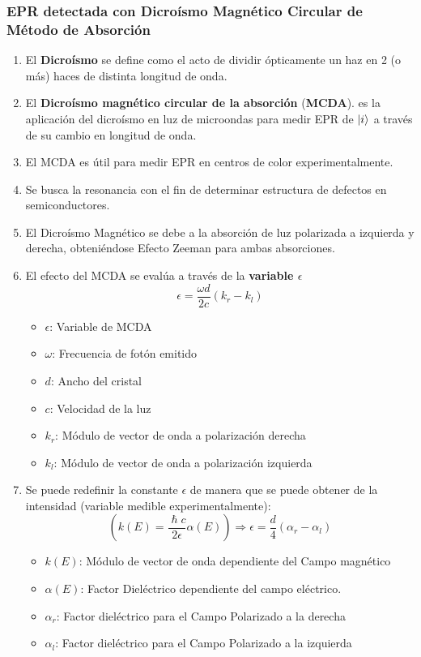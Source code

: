 \documentclass[aps,rmp,reprint,longbibliography]{revtex4-1}
\begin{document}
\subsubsection{EPR detectada con Dicroísmo Magnético Circular de Método de Absorción}
\begin{enumerate}
\item El \textbf{Dicroísmo} se define como el acto de dividir ópticamente un haz en 2 (o más) haces de distinta longitud de onda.
\item El \textbf{Dicroísmo magnético circular de la absorción} (\textbf{MCDA}). es la aplicación del dicroísmo en luz de microondas para medir EPR de $\ket{i}$ a través de su cambio en longitud de onda.
\item El MCDA es útil para medir EPR en centros de color experimentalmente. 
\item Se busca la resonancia con el fin de determinar estructura de defectos en semiconductores. 
\item El Dicroísmo Magnético se debe a la absorción de luz polarizada a izquierda y derecha, obteniéndose Efecto Zeeman para ambas absorciones.
\item El efecto del MCDA se evalúa a través de la \textbf{variable $\epsilon$}
\begin{equation}\label{eq21}\epsilon=\frac{\omega d}{2c}(k_r-k_l)\end{equation}
\begin{itemize}
    \item $\epsilon$: Variable de MCDA
    \item $\omega$: Frecuencia de fotón emitido
    \item $d$: Ancho del cristal 
    \item $c$: Velocidad de la luz
    \item $k_r$: Módulo de vector de onda a polarización derecha
    \item $k_l$: Módulo de vector de onda a polarización izquierda
\end{itemize}
\item Se puede redefinir la constante $\epsilon$ de manera que se puede obtener de la intensidad (variable medible experimentalmente):
\begin{equation}\label{eq22}(k(E)=\frac{\hslash c}{2 \epsilon} \alpha(E))\Rightarrow \epsilon =\frac{d}{4}(\alpha_r-\alpha_l)\end{equation}
\begin{itemize}
    \item $k(E)$: Módulo de vector de onda dependiente del Campo magnético
    \item $\alpha(E)$: Factor Dieléctrico dependiente del campo eléctrico. 
    \item $\alpha_r$: Factor dieléctrico para el Campo Polarizado a la derecha
    \item $\alpha_l$: Factor dieléctrico para el Campo Polarizado a la izquierda
\end{itemize}


\end{enumerate}
\end{document}
